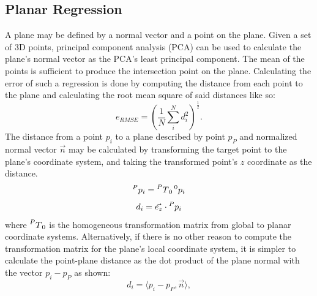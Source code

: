 \subsection{Planar Regression}\label{sec:planar_regression}
A plane may be defined by a normal vector and a point on the plane.
Given a set of 3D points, principal component analysis (PCA) can be used to calculate the plane's normal vector as the PCA's least principal component.
The mean of the points is sufficient to produce the intersection point on the plane.
Calculating the error of such a regression is done by computing the distance from each point to the plane and calculating the root mean square of said distances like so:
\begin{equation}
	e_{RMSE} = \left(\frac{1}{N}\sum_{i}^{N}d_i^2 \right)^{\frac{1}{2}}.
\end{equation}
The distance from a point $p_i$ to a plane described by point $p_P$ and normalized normal vector $\vec{n}$ may be calculated by transforming the target point to the plane's coordinate system, and taking the transformed point's $z$ coordinate as the distance.
\begin{equation}
	\prescript{P}{}p_i = \prescript{P}{}T_0 \prescript{0}{}p_i
\end{equation}
\begin{equation}
	d_i = \vec{e_z} \cdot \prescript{P}{}p_i
\end{equation}
where $\prescript{P}{}T_0$ is the homogeneous transformation matrix from global to planar coordinate systems.
Alternatively, if there is no other reason to compute the transformation matrix for the plane's local coordinate system, it is simpler to calculate the point-plane distance as the dot product of the plane normal with the vector $p_i - p_P$ as shown:
\begin{equation}
	d_i = \langle p_i - p_P, \vec{n}\rangle,
\end{equation}

